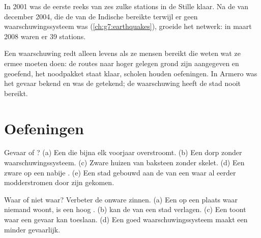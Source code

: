 \begin{history}
In 2001 was de eerste reeks van zes zulke stations in de Stille 
klaar. Na de  van december 2004, die de  van de Indische
 bereikte terwijl er geen waarschuwingssysteem was
(\cref{ch:g7:earthquakes}), groeide het netwerk: in maart 2008 waren er
39 stations.
\end{history}

Een waarschuwing redt alleen levens als ze mensen bereikt die weten wat ze
ermee moeten doen: de routes naar hoger gelegen grond zijn aangegeven en
geoefend, het noodpakket staat klaar, scholen houden oefeningen. In Armero
was het gevaar bekend en was de  getekend; de waarschuwing heeft de
stad nooit bereikt.

\section{Oefeningen}

\begin{exercise}[$\star$]\label{exo:g9:natural-risks:1}
Gevaar of ? (a) Een  die bijna elk voorjaar
overstroomt. (b) Een dorp zonder waarschuwingssysteem. (c) Zware huizen
van baksteen zonder skelet. (d) Een zware  op een nabije .
(e) Een stad gebouwd aan de  van een  waar al eerder
modderstromen door zijn gekomen.
\end{exercise}

\begin{exercise}[$\star$]\label{exo:g9:natural-risks:2}
Waar of niet waar? Verbeter de onware zinnen. (a) Een  op een
plaats waar niemand woont, is een hoog . (b)  kan de
 van een stad verlagen. (c) Een  toont waar een
gevaar kan toeslaan. (d) Een goed waarschuwingssysteem maakt een 
minder gevaarlijk.
\end{exercise}

